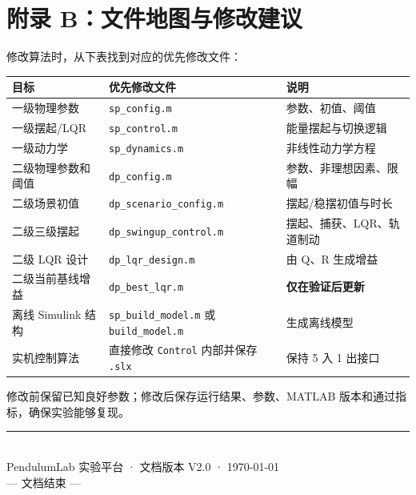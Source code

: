 \documentclass[12pt,a4paper]{article}
\begin{document}
\section{附录 B：文件地图与修改建议}

修改算法时，从下表找到对应的优先修改文件：

\begin{center}
    \renewcommand{\arraystretch}{1.4}
    \begin{tabular}{@{}p{5.6cm} p{6.2cm} p{3.6cm}@{}}
        \toprule
        \textbf{目标} & \textbf{优先修改文件} & \textbf{说明} \\
        \midrule
        一级物理参数 & \texttt{sp\_config.m} & 参数、初值、阈值 \\
        一级摆起/LQR & \texttt{sp\_control.m} & 能量摆起与切换逻辑 \\
        一级动力学 & \texttt{sp\_dynamics.m} & 非线性动力学方程 \\
        二级物理参数和阈值 & \texttt{dp\_config.m} & 参数、非理想因素、限幅 \\
        二级场景初值 & \texttt{dp\_scenario\_config.m} & 摆起/稳摆初值与时长 \\
        二级三级摆起 & \texttt{dp\_swingup\_control.m} & 摆起、捕获、LQR、轨道制动 \\
        二级 LQR 设计 & \texttt{dp\_lqr\_design.m} & 由 Q、R 生成增益 \\
        二级当前基线增益 & \texttt{dp\_best\_lqr.m} & \textbf{仅在验证后更新} \\
        离线 Simulink 结构 & \texttt{sp\_build\_model.m} 或 \texttt{build\_model.m} & 生成离线模型 \\
        实机控制算法 & 直接修改 \texttt{Control} 内部并保存 \texttt{.slx} & 保持 5 入 1 出接口 \\
        \bottomrule
    \end{tabular}
\end{center}

\begin{warnbox}
    修改前保留已知良好参数；修改后保存运行结果、参数、MATLAB 版本和通过指标，确保实验能够复现。
\end{warnbox}

\vfill
\begin{center}
    {\color{gray!60}\rule{0.4\textwidth}{0.4pt}} \\[1em]
    {\small\color{gray} PendulumLab 实验平台 · 文档版本 V2.0 · \today} \\[0.6em]
    {\color{gray} --- 文档结束 ---}
\end{center}
\end{document}
